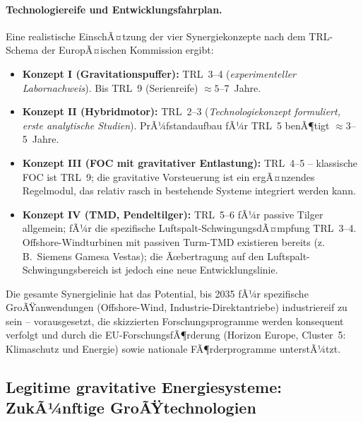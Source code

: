 ﻿\documentclass[12pt, a4paper]{report}
\theoremstyle{definition}
\theoremstyle{remark}
\begin{document}
\paragraph{Technologiereife und Entwicklungsfahrplan.}
Eine realistische EinschÃ¤tzung der vier Synergiekonzepte nach dem TRL-Schema der
EuropÃ¤ischen Kommission ergibt:
\begin{itemize}
  \item \textbf{Konzept I (Gravitationspuffer):} TRL~3--4 (\emph{experimenteller
        Labornachweis}). Bis TRL~9 (Serienreife) $\approx 5$--7~Jahre.
  \item \textbf{Konzept II (Hybridmotor):} TRL~2--3 (\emph{Technologiekonzept
        formuliert, erste analytische Studien}). PrÃ¼fstandaufbau fÃ¼r TRL~5
        benÃ¶tigt $\approx 3$--5~Jahre.
  \item \textbf{Konzept III (FOC mit gravitativer Entlastung):} TRL~4--5 --
        klassische FOC ist TRL~9; die gravitative Vorsteuerung ist ein ergÃ¤nzendes
        Regelmodul, das relativ rasch in bestehende Systeme integriert werden kann.
  \item \textbf{Konzept IV (TMD, Pendeltilger):} TRL~5--6 fÃ¼r passive Tilger
        allgemein; fÃ¼r die spezifische Luftspalt-SchwingungsdÃ¤mpfung TRL~3--4.
        Offshore-Windturbinen mit passiven Turm-TMD existieren bereits (z.\,B.\
        Siemens Gamesa Vestas); die Ãœbertragung auf den Luftspalt-Schwingungsbereich
        ist jedoch eine neue Entwicklungslinie.
\end{itemize}
Die gesamte Synergielinie hat das Potential, bis 2035 fÃ¼r spezifische
GroÃŸanwendungen (Offshore-Wind, Industrie-Direktantriebe) industriereif zu sein
-- vorausgesetzt, die skizzierten Forschungsprogramme werden konsequent verfolgt
und durch die EU-Forschungs\-fÃ¶rderung (Horizon Europe, Cluster~5: Klimaschutz und
Energie) sowie nationale FÃ¶rderprogramme unterstÃ¼tzt.

\subsection{Legitime gravitative Energiesysteme: ZukÃ¼nftige GroÃŸtechnologien}
\end{document}
